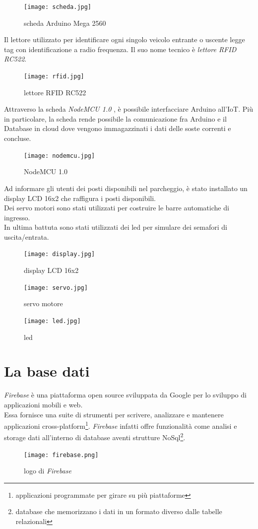 \documentclass[a4paper,titlepage]{report}
\begin{document}
\newpage
\begin{figure}[h]
\centering
\texttt{[image: scheda.jpg]}
\caption{scheda Arduino Mega 2560}
\end{figure}
Il lettore utilizzato per identificare ogni singolo veicolo entrante o uscente legge tag con identificazione a radio frequenza. Il suo nome tecnico è {\itshape lettore RFID RC522}.
\begin{figure}[h]
\centering
\texttt{[image: rfid.jpg]}
\caption{lettore RFID RC522}
\end{figure}
\newpage
Attraverso la scheda {\itshape NodeMCU 1.0} , è possibile interfacciare Arduino all’IoT. Più in particolare, la scheda rende possibile la comunicazione fra Arduino e il Database in cloud dove vengono immagazzinati i dati delle soste correnti e concluse.
\begin{figure}[h]
\centering
\texttt{[image: nodemcu.jpg]}
\caption{NodeMCU 1.0}
\end{figure}

Ad informare gli utenti dei posti disponibili nel parcheggio, è stato installato un display LCD 16x2 che raffigura i posti disponibili.\\
Dei servo motori sono stati utilizzati per costruire le barre automatiche di ingresso.\\
In ultima battuta sono stati utilizzati dei led per simulare dei semafori di uscita/entrata.

\begin{figure}[!htb]
  \texttt{[image: display.jpg]}
  \caption{display LCD 16x2}
\endminipage\hfill
{}
  \texttt{[image: servo.jpg]}
  \caption{servo motore}
\endminipage\hfill
{}%
  \texttt{[image: led.jpg]}
  \caption{led}
\endminipage
\end{figure}

\newpage
\section*{La base dati}
{\itshape Firebase} è una piattaforma open source sviluppata da Google per lo sviluppo di applicazioni mobili e web.\\
Essa fornisce una suite di strumenti per scrivere, analizzare e mantenere applicazioni cross-platform\footnote{applicazioni programmate per girare su più piattaforme}. {\itshape Firebase} infatti offre funzionalità come analisi e storage dati all'interno di database aventi strutture NoSql\footnote{database che memorizzano i dati in un formato diverso dalle tabelle relazionali}.
\begin{figure}[h]
\centering
\texttt{[image: firebase.png]}
\caption{logo di {\itshape Firebase}}
\end{figure}
\end{document}
